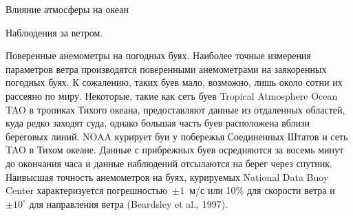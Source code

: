 \begin{chapter}{Влияние атмосферы на океан}
\begin{section}{Наблюдения за ветром.}
\begin{paragraph}{Поверенные анемометры на погодных буях.}
Наиболее точные измерения параметров ветра производятся поверенными
анемометрами на заякоренных погодных буях. К сожалению, таких буев
мало, возможно, лишь около сотни их рассеяно по миру. Некоторые, такие
как сеть буев Tropical Atmosphere Ocean TAO в тропиках Тихого океана,
предоставляют данные из отдаленных областей, куда редко заходят суда,
однако большая часть буев расположена вблизи береговых линий. NOAA
курирует буи у побережья Соединенных Штатов и сеть TAO в Тихом
океане. Данные с прибрежных буев осредняются за восемь минут до
окончания часа и данные наблюдений отсылаются на берег через спутник.
Наивысшая точность анемометров на буях, курируемых National Data Buoy
Center характеризуется погрешностью~$\pm 1$~м/с или 10\% для скорости ветра
и~$\pm 10^\circ$ для направления ветра (Beardsley et al., 1997).
%
% 
\end{paragraph}
\end{section}


\end{chapter}
